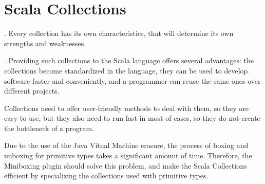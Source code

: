 \section{Scala Collections}



. Every collection has its own characteristics, that will determine its own strengths and weaknesses.

. Providing such collections to the Scala language offers several advantages: the collections become standardized in the language, they can be used to develop software faster and conveniently, and a programmer can reuse the same ones over different projects.

 Collections need to offer user-friendly methods to deal with them, so they are easy to use, but they also need to run fast in most of cases, so they do not create the bottleneck of a program. 

 Due to the use of the Java Vitual Machine erasure, the process of boxing and unboxing for primitive types takes a significant amount of time. Therefore, the Miniboxing plugin should solve this problem, and make the Scala Collections efficient by specializing the collections used with primitive types.

% 
% 
% 


